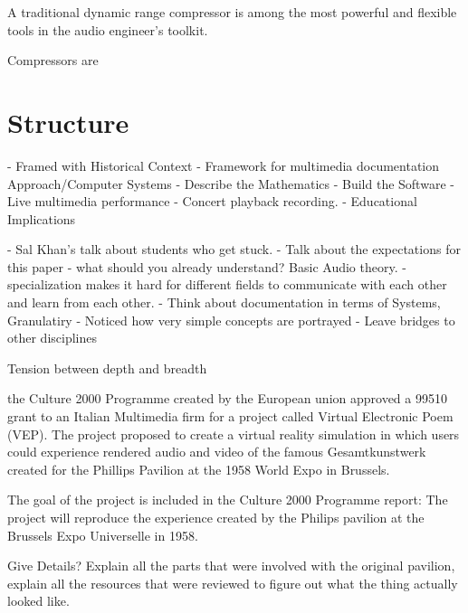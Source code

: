 \documentclass{tufte-book}
\begin{document}
A traditional dynamic range compressor is among the most powerful and
flexible tools in the audio engineer's toolkit.

Compressors are 

\section{Structure}
\label{sec:structure}

  - Framed with Historical Context
  - Framework for multimedia documentation Approach/Computer Systems
  - Describe the Mathematics 
  - Build the Software
  - Live multimedia performance
  - Concert playback recording. 
  - Educational Implications


  - Sal Khan's talk about students who get stuck. 
    - Talk about the expectations for this paper - what should you
    already understand? Basic Audio theory. 
  - specialization makes it hard for different fields to communicate
  with each other and learn from each other. 
  - Think about documentation in terms of Systems, Granulatiry
  - Noticed how very simple concepts are portrayed 
  - Leave bridges to other disciplines 
  

Tension between depth and breadth

 the Culture 2000 Programme created by the 
European union approved a 99510\EUR{} grant to an Italian Multimedia 
firm for a project called Virtual Electronic Poem (VEP)\cite{eu2004}. 
The project proposed to create a virtual reality simulation in which 
users could experience rendered audio and video of the famous
Gesamtkunstwerk created for the Phillips Pavilion at the 1958 World
Expo in Brussels. 

The goal of the project is included in the Culture 2000 Programme
report: The project will reproduce the experience created by the
Philips pavilion at the Brussels Expo Universelle in 1958.

Give Details? Explain all the parts that were involved with the
original pavilion, explain all the resources that were reviewed to
figure out what the thing actually looked like.
\end{document}
